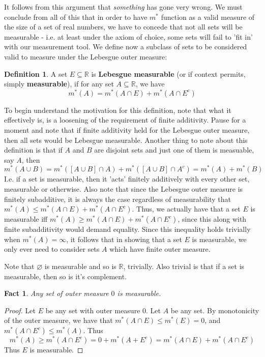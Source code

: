 \documentclass{article}
\theoremstyle{definition}
\newtheorem{definition}{Definition}[section]
\theoremstyle{plain}
\theoremstyle{theorem}
\newtheorem{fact}{Fact}[section]
\begin{document}
\par It follows from this argument that \textit{something} has gone very wrong. We must conclude from all of this that in order to have $m^*$ function as a valid measure of the size of a set of real numbers, we have to concede that not all sets will be measurable - i.e. at least under the axiom of choice, some sets will fail to 'fit in' with our measurement tool. We define now a subclass of sets to be considered valid to measure under the Lebesgue outer measure:
\begin{definition}
	A set $E \subseteq \mathbb{R}$ is \textbf{Lebesgue measurable} (or if context permits, simply \textbf{measurable}), if for any set $A \subseteq \mathbb{R}$, we have
	\[ m^*(A) = m^*(A \cap E) + m^*(A \cap E^c) \]
\end{definition}
To begin understand the motivation for this definition, note that what it effectively is, is a loosening of the requirement of finite additivity. Pause for a moment and note that if finite additivity held for the Lebesgue outer measure, then all sets would be Lebesgue measurable. Another thing to note about this definition is that if $A$ and $B$ are disjoint sets and just one of them is measuable, say $A$, then
	\[m^*(A \cup B) = m^*([A \cup B] \cap A)+m^*([A \cup B] \cap A^c) = m^*(A)+m^*(B) \]
I.e. if a set is measurable, then it 'acts' finitely additively with every other set, measurable or otherwise. Also note that since the Lebesgue outer measure is finitely subadditive, it is always the case regardless of measurability that
$m^*(A) \leq m^*(A \cap E) + m^*(A \cap E^c)$. Thus, we actually have that a set $E$ is measurable iff $m^*(A) \geq m^*(A \cap E) + m^*(A \cap E^c)$, since this along with finite subadditivity would demand equality. Since this inequality holds trivially when $m^*(A) = \infty$, it follows that in showing that a set $E$ is measurable, we only ever need to consider sets $A$ which have finite outer measure. \par
Note that $\varnothing$ is measurable and so is $\mathbb{R}$, trivially. Also trivial is that if a set is measurable, then so is it's complement.
\begin{fact}
	Any set of outer measure $0$ is measurable.
\end{fact}
\begin{proof}
	Let $E$ be any set with outer measure $0$. Let $A$ be any set. By monotonicity of the outer measure, we have that $m^*(A \cap E) \leq m^*(E) = 0$, and $m^*(A \cap E^c) \leq m^*(A)$. Thus
	\[ m^*(A) \geq m^*(A \cap E^c) = 0+m^*(A+E^c) = m^*(A\cap E) + m^*(A \cap E^c) \]
	Thus $E$ is measurable.
\end{proof}
\end{document}
